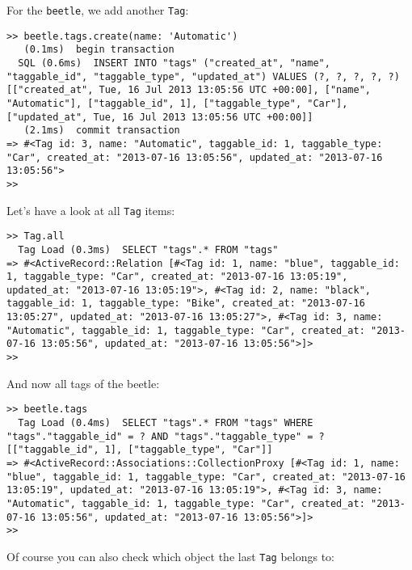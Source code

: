 \documentclass[a4paper]{book}
\begin{document}
For the \texttt{beetle}, we add another \texttt{Tag}:

\begin{shaded}\begin{verbatim}
>> beetle.tags.create(name: 'Automatic')
   (0.1ms)  begin transaction
  SQL (0.6ms)  INSERT INTO "tags" ("created_at", "name", "taggable_id", "taggable_type", "updated_at") VALUES (?, ?, ?, ?, ?)  [["created_at", Tue, 16 Jul 2013 13:05:56 UTC +00:00], ["name", "Automatic"], ["taggable_id", 1], ["taggable_type", "Car"], ["updated_at", Tue, 16 Jul 2013 13:05:56 UTC +00:00]]
   (2.1ms)  commit transaction
=> #<Tag id: 3, name: "Automatic", taggable_id: 1, taggable_type: "Car", created_at: "2013-07-16 13:05:56", updated_at: "2013-07-16 13:05:56">
>>
\end{verbatim}\end{shaded}

Let's have a look at all \texttt{Tag} items:

\begin{shaded}\begin{verbatim}
>> Tag.all
  Tag Load (0.3ms)  SELECT "tags".* FROM "tags"
=> #<ActiveRecord::Relation [#<Tag id: 1, name: "blue", taggable_id: 1, taggable_type: "Car", created_at: "2013-07-16 13:05:19", updated_at: "2013-07-16 13:05:19">, #<Tag id: 2, name: "black", taggable_id: 1, taggable_type: "Bike", created_at: "2013-07-16 13:05:27", updated_at: "2013-07-16 13:05:27">, #<Tag id: 3, name: "Automatic", taggable_id: 1, taggable_type: "Car", created_at: "2013-07-16 13:05:56", updated_at: "2013-07-16 13:05:56">]>
>>
\end{verbatim}\end{shaded}

And now all tags of the beetle:

\begin{shaded}\begin{verbatim}
>> beetle.tags
  Tag Load (0.4ms)  SELECT "tags".* FROM "tags" WHERE "tags"."taggable_id" = ? AND "tags"."taggable_type" = ?  [["taggable_id", 1], ["taggable_type", "Car"]]
=> #<ActiveRecord::Associations::CollectionProxy [#<Tag id: 1, name: "blue", taggable_id: 1, taggable_type: "Car", created_at: "2013-07-16 13:05:19", updated_at: "2013-07-16 13:05:19">, #<Tag id: 3, name: "Automatic", taggable_id: 1, taggable_type: "Car", created_at: "2013-07-16 13:05:56", updated_at: "2013-07-16 13:05:56">]>
>>
\end{verbatim}\end{shaded}

Of course you can also check which object the last \texttt{Tag} belongs to:
\end{document}
